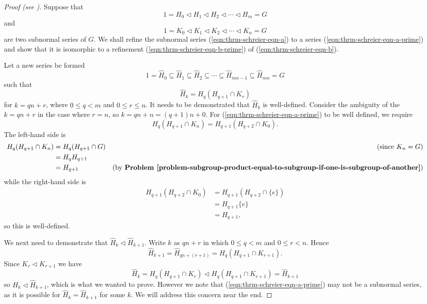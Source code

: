 \begin{proof}[Proof (see {\cite[\S 72]{clark_1984}})]
    Suppose that
    \begin{equation}\label{eqn:thrm-schreier-eqn-a}
        1 = H_0 \lhd H_1 \lhd H_2 \lhd \cdots \lhd H_m = G    
        \tag{A}
    \end{equation}
    and
    \begin{equation}\label{eqn:thrm-schreier-eqn-b}
        1 = K_0 \lhd K_1 \lhd K_2 \lhd \cdots \lhd K_n = G    
        \tag{B}
    \end{equation}
    are two subnormal series of $G$. We shall refine the subnormal series (\ref{eqn:thrm-schreier-eqn-a}) to a series (\ref{eqn:thrm-schreier-eqn-a-prime}) and show that it is isomorphic to a refinement (\ref{eqn:thrm-schreier-eqn-b-prime}) of (\ref{eqn:thrm-schreier-eqn-b}).
    
    Let a new series be formed
    \begin{equation}\label{eqn:thrm-schreier-eqn-a-prime}
        1 = \hat{H}_0 \subseteq \hat{H}_1 \subseteq \hat{H}_2 \subseteq \cdots \subseteq \hat{H}_{mn - 1} \subseteq \hat{H}_{mn} = G
        \tag{A'}
    \end{equation}
    such that
    \[
        \hat{H}_k = H_q(H_{q+1}\cap K_r)
    \]
    for $k = qn + r$, where $0 \leq q < m$ and $0 \leq r \leq n$. It needs to be demonstrated that $\hat{H}_k$ is well-defined. Consider the ambiguity of the $k = qn + r$ in the case where $r = n$, so $k = qn + n = (q+1)n + 0$. For (\ref{eqn:thrm-schreier-eqn-a-prime}) to be well defined, we require
    \[
        H_q(H_{q+1} \cap K_n) = H_{q+1}(H_{q+2} \cap K_0).
    \]
    The left-hand side is
    \begin{align*}
        H_q(H_{q+1} \cap K_n) &= H_q(H_{q+1} \cap G) & (\text{since } K_n = G)\\
        &= H_qH_{q+1}\\
        &= H_{q+1} & (\text{by \textbf{Problem \ref{problem-subgroup-product-equal-to-subgroup-if-one-is-subgroup-of-another}}})
    \end{align*}
    while the right-hand side is
    \begin{align*}
        H_{q+1}(H_{q+2} \cap K_0) &= H_{q+1}(H_{q+2} \cap \{e\})\\
        &= H_{q+1}\{e\}\\
        &= H_{q+1},
    \end{align*}
    so this is well-defined.
    
    We next need to demonstrate that $\hat{H}_k \lhd \hat{H}_{k+1}$. Write $k$ as $qn+r$ in which $0 \leq q < m$ and $0 \leq r < n$. Hence
    \[
        \hat{H}_{k+1} = \hat{H}_{qn+(r+1)} = H_q(H_{q+1}\cap K_{r+1}). 
    \]
    Since $K_r \lhd K_{r+1}$ we have
    \[
        \hat{H}_k = H_q(H_{q+1}\cap K_r) \lhd H_q(H_{q+1}\cap K_{r+1}) = \hat{H}_{k+1}
    \]
    so $\hat{H}_k \lhd \hat{H}_{k+1}$, which is what we wanted to prove. However we note that (\ref{eqn:thrm-schreier-eqn-a-prime}) may not be a subnormal series, as it is possible for $\hat{H}_k = \hat{H}_{k+1}$ for some $k$. We will address this concern near the end.
    

\end{proof}
